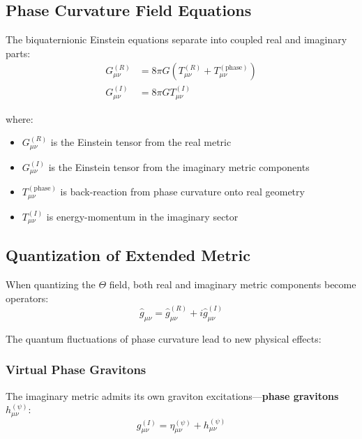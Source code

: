 \documentclass[12pt]{article}
\begin{document}
\subsection{Phase Curvature Field Equations}

The biquaternionic Einstein equations separate into coupled real and imaginary parts:
\begin{align}
    G_{\mu\nu}^{(R)} &= 8\pi G \left(T_{\mu\nu}^{(R)} + T_{\mu\nu}^{(\text{phase})} \right) \label{eq:einstein_real} \\
    G_{\mu\nu}^{(I)} &= 8\pi G T_{\mu\nu}^{(I)} \label{eq:einstein_imag}
\end{align}

where:
\begin{itemize}
    \item $G_{\mu\nu}^{(R)}$ is the Einstein tensor from the real metric
    \item $G_{\mu\nu}^{(I)}$ is the Einstein tensor from the imaginary metric components
    \item $T_{\mu\nu}^{(\text{phase})}$ is back-reaction from phase curvature onto real geometry
    \item $T_{\mu\nu}^{(I)}$ is energy-momentum in the imaginary sector
\end{itemize}

\subsection{Quantization of Extended Metric}

When quantizing the $\Theta$ field, both real and imaginary metric components become operators:
\begin{equation}
    \hat{g}_{\mu\nu} = \hat{g}_{\mu\nu}^{(R)} + i\hat{g}_{\mu\nu}^{(I)}
\end{equation}

The quantum fluctuations of phase curvature lead to new physical effects:

\subsubsection{Virtual Phase Gravitons}

The imaginary metric admits its own graviton excitations—\textbf{phase gravitons} $h_{\mu\nu}^{(\psi)}$:
\begin{equation}
    g_{\mu\nu}^{(I)} = \eta_{\mu\nu}^{(\psi)} + h_{\mu\nu}^{(\psi)}
\end{equation}
\end{document}

